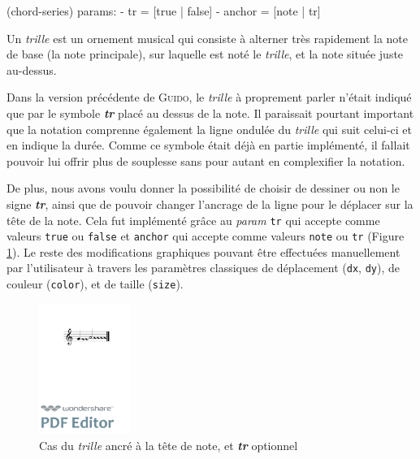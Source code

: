 \documentclass{article}
\newenvironment{gmncode}	{\vspace{-2mm}\small\verbatim}{\endverbatim\vspace{-2mm}}
\newcommand{\guido}			{\textsc{Guido}}
\newcommand{\code}[1]		{{\small \texttt{#1}}}
\begin{document}
\begin{gmncode}
  (chord-series)
   params:
    - tr = [true | false]
    - anchor = [note | tr]
\end{gmncode}

Un \emph{trille} est \og{}un ornement musical qui consiste à alterner très rapidement la note de base (la note principale), sur laquelle est noté le \emph{trille}, et la note située juste au-dessus\fg{}.

Dans la version précédente de \guido{}, le \emph{trille} à proprement parler n'était indiqué que par le symbole \textit{\textbf{tr}} placé au dessus de la note. Il paraissait pourtant important que la notation comprenne également la ligne ondulée du \emph{trille} qui suit celui-ci et en indique la durée. Comme ce symbole était déjà en partie implémenté, il fallait pouvoir lui offrir plus de souplesse sans pour autant en complexifier la notation.


De plus, nous avons voulu donner la possibilité de choisir de dessiner ou non le signe \textit{\textbf{tr}}, ainsi que de pouvoir changer l'ancrage de la ligne pour le déplacer sur la tête de la note. Cela fut implémenté grâce au \emph{param} \code{tr} qui accepte comme valeurs \code{true} ou \code{false} et \code{anchor} qui accepte comme valeurs \code{note} ou \code{tr} (Figure \ref{fig:trillanchor}). Le reste des modifications graphiques pouvant être effectuées manuellement par l'utilisateur à travers les paramètres classiques de déplacement (\code{dx}, \code{dy}), de couleur (\code{color}), et de taille (\code{size}).

\begin{figure}[h]
\centering
\begin{gmncode}
[ \trill<tr="false", anchor="note">
( {g} {a/2} ) ]
\end{gmncode}
\includegraphics[width=30mm]{img/trillanchor.pdf}
\caption{Cas du \emph{trille} ancré à la tête de note, et \textit{\textbf{tr}} optionnel}
\label{fig:trillanchor}
\end{figure}
\end{document}
